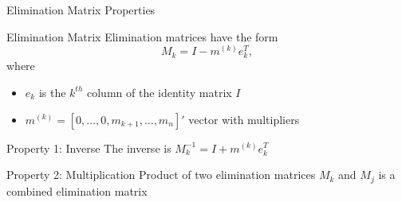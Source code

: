 \documentclass[10pt]{beamer}
\begin{document}
\begin{frame}{Elimination Matrix Properties}
    \begin{block}{Elimination Matrix}
    Elimination matrices have the form
        $$ M_k = I - m^{(k)} e_k^T,$$
        where 
    \begin{itemize}
    \item $e_k$ is the $k^{th}$ column of the identity matrix $I$
    \item $m^{(k)} = [0,\dots,0,m_{k+1},\dots,m_n]'$ vector with multipliers
    \end{itemize}
    \end{block}

  \begin{block}{Property 1: Inverse}
  The inverse is $M^{-1}_k = I + m^{(k)} e_k^T$
  \end{block}
  
  \begin{block}{Property 2: Multiplication}
  Product of two elimination matrices $M_k$ and $M_j$ is a combined elimination matrix      
  \end{block}
\end{frame}

\end{document}
